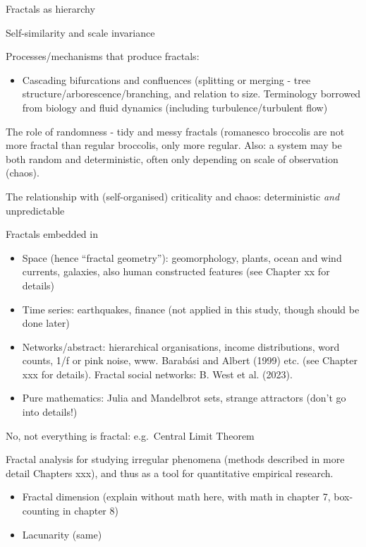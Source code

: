 \documentclass[
  12pt,
  a4paper, twoside]{book}
\providecommand{\tightlist}{%
  \setlength{\itemsep}{0pt}\setlength{\parskip}{0pt}}
\begin{document}
Fractals as hierarchy

Self-similarity and scale invariance

Processes/mechanisms that produce fractals:

\begin{itemize}
\tightlist
\item
  Cascading bifurcations and confluences (splitting or merging - tree structure/arborescence/branching, and relation to size. Terminology borrowed from biology and fluid dynamics (including turbulence/turbulent flow)
\end{itemize}

The role of randomness - tidy and messy fractals (romanesco broccolis are not more fractal than regular broccolis, only more regular. Also: a system may be both random and deterministic, often only depending on scale of observation (chaos).

The relationship with (self-organised) criticality and chaos: deterministic \emph{and} unpredictable

Fractals embedded in

\begin{itemize}
\item
  Space (hence ``fractal geometry''): geomorphology, plants, ocean and wind currents, galaxies, also human constructed features (see Chapter xx for details)
\item
  Time series: earthquakes, finance (not applied in this study, though should be done later)
\item
  Networks/abstract: hierarchical organisations, income distributions, word counts, 1/f or pink noise, www. Barabási and Albert (1999) etc. (see Chapter xxx for details). Fractal social networks: B. West et al. (2023).
\item
  Pure mathematics: Julia and Mandelbrot sets, strange attractors (don't go into details!)
\end{itemize}

No, not everything is fractal: e.g.~Central Limit Theorem

Fractal analysis for studying irregular phenomena (methods described in more detail Chapters xxx), and thus as a tool for quantitative empirical research.

\begin{itemize}
\item
  Fractal dimension (explain without math here, with math in chapter 7, box-counting in chapter 8)
\item
  Lacunarity (same)
\end{itemize}
\end{document}
